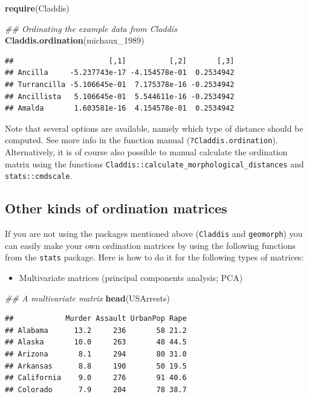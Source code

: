 \documentclass[
]{book}
\newenvironment{Shaded}{\begin{snugshade}}{\end{snugshade}}
\newcommand{\CommentTok}[1]{\textcolor[rgb]{0.56,0.35,0.01}{\textit{#1}}}
\newcommand{\DecValTok}[1]{\textcolor[rgb]{0.00,0.00,0.81}{#1}}
\newcommand{\KeywordTok}[1]{\textcolor[rgb]{0.13,0.29,0.53}{\textbf{#1}}}
\newcommand{\NormalTok}[1]{#1}
\providecommand{\tightlist}{%
  \setlength{\itemsep}{0pt}\setlength{\parskip}{0pt}}
\begin{document}
\begin{Shaded}
\begin{Highlighting}[]
\KeywordTok{require}\NormalTok{(Claddis)}

\CommentTok{\#\# Ordinating the example data from Claddis}
\KeywordTok{Claddis.ordination}\NormalTok{(michaux\_}\DecValTok{1989}\NormalTok{)}
\end{Highlighting}
\end{Shaded}

\begin{verbatim}
##                      [,1]          [,2]       [,3]
## Ancilla     -5.237743e-17 -4.154578e-01  0.2534942
## Turrancilla -5.106645e-01  7.175378e-16 -0.2534942
## Ancillista   5.106645e-01  5.544611e-16 -0.2534942
## Amalda       1.603581e-16  4.154578e-01  0.2534942
\end{verbatim}

Note that several options are available, namely which type of distance should be computed.
See more info in the function manual (\texttt{?Claddis.ordination}).
Alternatively, it is of course also possible to manual calculate the ordination matrix using the functions \texttt{Claddis::calculate\_morphological\_distances} and \texttt{stats::cmdscale}.

\hypertarget{other-kinds-of-ordination-matrices}{%
\subsection{Other kinds of ordination matrices}\label{other-kinds-of-ordination-matrices}}

If you are not using the packages mentioned above (\texttt{Claddis} and \texttt{geomorph}) you can easily make your own ordination matrices by using the following functions from the \texttt{stats} package.
Here is how to do it for the following types of matrices:

\begin{itemize}
\tightlist
\item
  Multivariate matrices (principal components analysis; PCA)
\end{itemize}

\begin{Shaded}
\begin{Highlighting}[]
\CommentTok{\#\# A multivariate matrix}
\KeywordTok{head}\NormalTok{(USArrests)}
\end{Highlighting}
\end{Shaded}

\begin{verbatim}
##            Murder Assault UrbanPop Rape
## Alabama      13.2     236       58 21.2
## Alaska       10.0     263       48 44.5
## Arizona       8.1     294       80 31.0
## Arkansas      8.8     190       50 19.5
## California    9.0     276       91 40.6
## Colorado      7.9     204       78 38.7
\end{verbatim}
\end{document}
